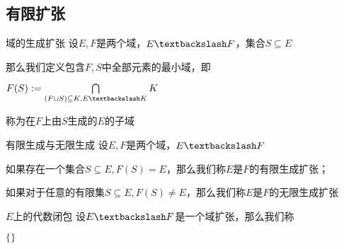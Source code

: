 \documentclass[12pt, a4paper, oneside, UTF8]{ctexbook}
\begin{document}
		\subsection{有限扩张}
			\begin{defn}{域的生成扩张}{}
				设$E,F$是两个域，$E\textbackslash F$，集合$S \subseteq E$

				那么我们定义包含$F,S$中全部元素的最小域，即

				$F(S) := \bigcap\limits_{(F \cup S) \subseteq K,E \textbackslash K} K$

				称为在$F$上由$S$生成的$E$的子域
			\end{defn}
			\begin{defn}{有限生成与无限生成}{}
				设$E,F$是两个域，$E\textbackslash F$

				如果存在一个集合$S \subseteq E,F(S) = E$，那么我们称$E$是$F$的有限生成扩张；

				如果对于任意的有限集$S \subseteq E,F(S) \neq E$，那么我们称$E$是$F$的无限生成扩张
			\end{defn}
			\begin{defn}{$E$上的代数闭包}{}
				设$E \textbackslash F$是一个域扩张，那么我们称
				
				$\{\}$
			\end{defn}
\ifx\allfiles\undefined
\end{document}
